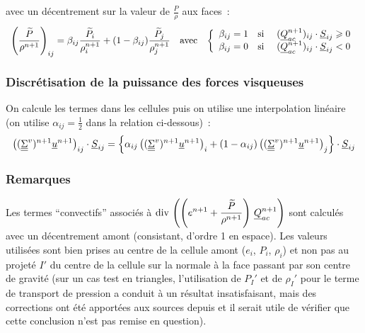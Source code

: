 avec un d\'ecentrement sur la valeur de
$\displaystyle\frac{P}{\rho}$ aux faces~:
\begin{equation}
\begin{array}{lll}
\left(\displaystyle\frac{\widetilde{P}}{\rho^{n+1}}\right)_{ij}
 = \beta_{ij}\displaystyle\frac{\widetilde{P}_i}{\rho^{n+1}_i}
+ (1-\beta_{ij})\displaystyle\frac{\widetilde{P}_j}{\rho^{n+1}_j}
& \text{avec}
& \left\{\begin{array}{lll}
\beta_{ij} = 1 & \text{si\ }
& (\underline{Q}_{ac}^{n+1})_{ij} \cdot \underline{S}_{ij} \geqslant 0 \\
\beta_{ij} = 0 & \text{si\ }
& (\underline{Q}_{ac}^{n+1})_{ij} \cdot \underline{S}_{ij} < 0 \\
\end{array}\right.
\end{array}
\end{equation}



\subsubsection*{Discr\'etisation de la puissance des forces visqueuses}

On calcule les termes dans les cellules puis on utilise une
interpolation lin\'eaire (on utilise
$\alpha_{ij}=\frac{1}{2}$ dans la relation ci-dessous)~:
\begin{equation}
\left((\underline{\underline{\Sigma}}^v)^{n+1} \underline{u}^{n+1} \right)_{ij}\cdot \underline{S}_{ij}
= \left\{\alpha_{ij} \left((\underline{\underline{\Sigma}}^v)^{n+1} \underline{u}^{n+1}\right)_i
+ (1-\alpha_{ij}) \left((\underline{\underline{\Sigma}}^v)^{n+1} \underline{u}^{n+1}\right)_j
\right\} \cdot \underline{S}_{ij}
\end{equation}


\subsubsection*{Remarques}


Les termes ``convectifs'' associ\'es \`a
$\displaystyle\text{div}\,\left(\left(e^{n+1}+\frac{\widetilde{P}}{\rho^{n+1}}\right)\,
\underline{Q}_{ac}^{n+1}\right)$ sont calcul\'es avec un d\'ecentrement amont
(consistant, d'ordre 1 en espace). Les valeurs utilis\'ees sont bien prises au
centre de la cellule amont ($e_i$, $P_i$, $\rho_i$) et non pas au projet\'e $I'$
du centre de la cellule sur la normale \`a la face passant par son centre de
gravit\'e (sur un cas test en triangles, l'utilisation de $P_I'$ et de $\rho_I'$
pour le terme de transport de pression a conduit \`a un r\'esultat
insatisfaisant, mais des corrections ont \'et\'e apport\'ees aux sources depuis
et il serait utile de v\'erifier que cette conclusion n'est pas remise en question).

